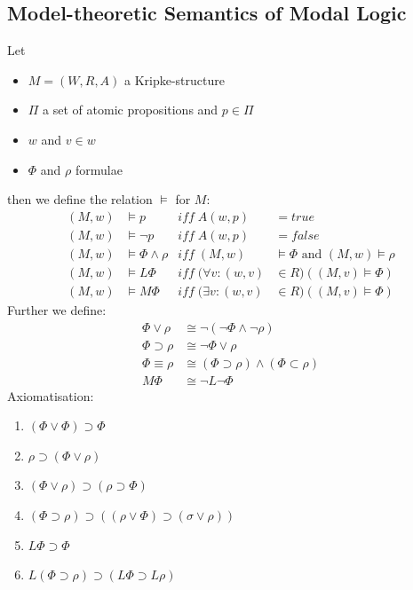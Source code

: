 \documentclass[a4paper, 10pt]{article}
\begin{document}
\subsection*{Model-theoretic Semantics of Modal Logic}
\begin{shaded}
    Let
    \begin{itemize}
        \item $M=(W,R,A)$ a Kripke-structure
        \item $\Pi$ a set of atomic propositions and $p\in\Pi$
        \item $w$ and $v\in w$
        \item $\Phi$ and $\rho$ formulae
    \end{itemize}
    then we define the relation $\models$ for $M$:
    \begin{align*}
    (M,w) & \models p               & iff \; A(w,p) & = true  \\
    (M,w) & \models \neg p          & iff \; A(w,p) & = false \\
    (M,w) & \models \Phi\wedge\rho  & iff \; (M,w)  & \models \Phi \textrm{ and } (M,w) \models \rho \\
    (M,w) & \models L\Phi           & iff \; (\forall v: (w,v) & \in R)((M,v)\models\Phi) \\
    (M,w) & \models M\Phi           & iff \; (\exists v:(w,v) & \in R)((M,v)\models\Phi)
    \end{align*}
    Further we define:
    \begin{align*}
    \Phi \vee \rho  & \cong \neg(\neg\Phi\wedge\neg\rho) \\
    \Phi\supset\rho & \cong \neg\Phi\vee\rho \\
    \Phi\equiv\rho  & \cong (\Phi\supset\rho)\wedge(\Phi\subset\rho) \\
    M\Phi           & \cong \neg L\neg\Phi
    \end{align*}
    Axiomatisation:
    \begin{multicols}{2}
    \begin{enumerate}
        \item $(\Phi\vee\Phi)\supset\Phi$
        \item $\rho\supset(\Phi\vee\rho)$
        \item $(\Phi\vee\rho)\supset(\rho\supset\Phi)$
        \item $(\Phi\supset\rho)\supset((\rho\vee\Phi)\supset(\sigma\vee\rho))$
        \item $L\Phi\supset\Phi$
        \item $L(\Phi\supset\rho)\supset(L\Phi\supset L\rho)$

\end{enumerate}
\end{multicols}
\end{shaded}
\end{document}
